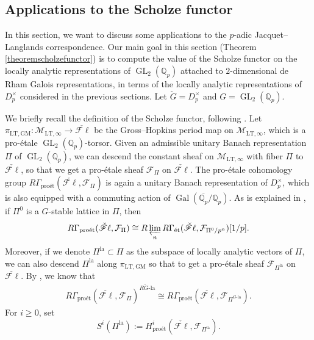 \documentclass{article}
\theoremstyle{definition}
\def\calF{\mathcal{F}}
\def\calM{\mathcal{M}}
\def\bbQ{\mathbb{Q}}
\def\isom{\cong}
\newcommand{\ilim}{\varprojlim}
\DeclareMathOperator{\Gal}{Gal}
\DeclareMathOperator{\GL}{GL}
\def\LT{\mathrm{LT}}
\def\et{\text{\'et}}
\def\lan{\mathrm{la}}
\def\-{\text{-}}
\def\pro{\mathrm{pro}}
\def\-{\text{-}}
\def\fl{\mathscr{F}\ell}
\def\GM{\mathrm{GM}}
\begin{document}
\subsection{Applications to the Scholze functor}\label{sec:application}
In this section, we want to discuss some applications to the $p$-adic Jacquet--Langlands correspondence. Our main goal in this section  (Theorem \ref{theoremscholzefunctor}) is to compute the value of the Scholze functor \cite{Scholze2018LubinTate,dospinescu2024jacquetlanglandsfunctorpadiclocally} on the locally analytic representations of $\GL_2(\bbQ_p)$ attached to $2$-dimensional de Rham Galois representations, in terms of the locally analytic representations of $D_p^{\times}$ considered in the previous sections. Let $\check{G}=D_p^{\times}$ and $G=\GL_2(\bbQ_p)$.

We briefly recall the definition of the Scholze functor, following \cite{Scholze2018LubinTate,dospinescu2024jacquetlanglandsfunctorpadiclocally}. Let $\pi_{\LT,\GM}:\calM_{\LT,\infty}\to \check{\fl}$ be the Gross--Hopkins period map on $\calM_{\LT,\infty}$, which is a pro-\'etale $\GL_2(\bbQ_p)$-torsor. Given an admissible unitary Banach representation $\Pi$ of $\GL_2(\bbQ_p)$, we can descend the constant sheaf on $\calM_{\LT,\infty}$ with fiber $\Pi$ to $\check{\fl}$, so that we get a pro-\'etale sheaf $\calF_{\Pi}$ on $\check{\fl}$. The pro-\'etale cohomology group $R\Gamma_{\pro\et}(\check{\fl},\calF_{\Pi})$ is again a unitary Banach representation of $D_p^\times$, which is also equipped with a commuting action of $\Gal(\overline{\bbQ_p}/\bbQ_p)$. As is explained in \cite[Corollary 5.3.5]{dospinescu2024jacquetlanglandsfunctorpadiclocally}, if $\Pi^0$ is a $G$-stable lattice in $\Pi$, then 
\begin{align}\label{eq:proetcohomologyaslimitofetale}
    R\Gamma_{\pro\et}(\check{\fl},\calF_{\Pi})\isom R\ilim_n R\Gamma_{\et}(\check{\fl},\calF_{\Pi^0/p^n})[1/p].
\end{align}
Moreover, if we denote $\Pi^{\lan}\subset \Pi$ as the subspace of locally analytic vectors of $\Pi$, we can also descend $\Pi^{\lan}$ along $\pi_{\LT,\GM}$ so that to get a pro-\'etale sheaf $\calF_{\Pi^{\lan}}$ on $\check{\fl}$. By \cite[Theorem 5.3.6]{dospinescu2024jacquetlanglandsfunctorpadiclocally}, we know that 
\begin{align}\label{eq:scholzefunctorlocanaly}
    R\Gamma_{\pro\et}(\check{\fl},\calF_{\Pi})^{R\check{G}\-\lan}\isom R\Gamma_{\pro\et}(\check{\fl},\calF_{\Pi^{G\-\lan}}).
\end{align}
For $i\geq 0$, set 
\[S^i(\Pi^{\lan}):=H^i_{\pro\et}(\check{\fl},\calF_{\Pi^{\lan}}).\]
\end{document}
